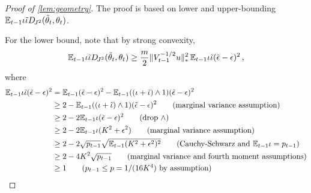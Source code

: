 \begin{proof}[Proof of \cref{lem:geometry}]
    The proof is based on lower and upper-bounding $\mathbb{E}_{t-1} \iota \tilde{\iota} D_{\!J^2}(\tilde{\theta}_t, \theta_t) $.

For the lower bound, note that by strong convexity, 
$$
    \mathbb{E}_{t-1} \iota \tilde{\iota}  D_{\!J^2}(\tilde{\theta}_t, \theta_t) \geq \frac{m}{2} \|V_{t-1}^{-1/2}u\|_{*}^2 \,\mathbb{E}_{t-1}  \iota \tilde{\iota} (\tilde{\epsilon} - \epsilon)^2\,,
$$
where
\begin{align*}
    \Et  \iota \tilde{\iota} (\tilde{\epsilon} - \epsilon)^2 
        &= \Et (\tilde{\epsilon} - \epsilon)^2 - \Et ((\iota + \tilde{\iota}) \wedge 1) (\tilde{\epsilon} - \epsilon)^2  \\
        &\geq 2 -  \Et ((\iota + \tilde{\iota}) \wedge 1) (\tilde{\epsilon} - \epsilon)^2  \tag{marginal variance assumption} \\
        &\geq 2 - 2\Et \iota (\tilde{\epsilon} - \epsilon)^2  \tag{drop $\wedge$} \\
        &\geq 2 - 2\Et \iota (K^2 + \epsilon^2)  \tag{marginal variance assumption} \\
        &\geq 2 - 2 \sqrt{p_{t-1}}\sqrt{\Et(K^2 + \epsilon^2)^2} \tag{Cauchy-Schwarz and $\Et \iota = p_{t-1}$} \\
        &\geq 2 - 4K^2 \sqrt{p_{t-1}} \tag{marginal variance and fourth moment assumptions} \\
        &\geq 1 \tag{$p_{t-1} \leq p = 1/(16K^4)$ by assumption}
\end{align*}


\end{proof}
